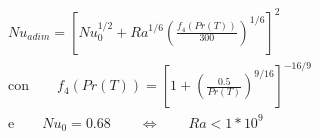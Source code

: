\documentclass[a4paper,10pt]{article}                                                                                       %
\begin{document}
\begin{equation}                                                                                                            %
  \begin{aligned}                                                                                                           %
  Nu_{adim} = \left[Nu_0^{1/2}+Ra^{1/6}\left(\frac{f_4(Pr(T))}{300}\right)^{1/6}\right]^{2}                                 %
  \\\text{con}\qquad                                                                                                        %
  f_4(Pr(T)) = \left[1+\left(\frac{0.5}{Pr(T)}\right)^{9/16}\right]^{-16/9}                                                 %
  \\\text{e}\qquad                                                                                                          %
  Nu_0 = 0.68                                                                                                               %
  \qquad\Leftrightarrow\qquad                                                                                               %
  Ra<1*10^9\qquad                                                                                                           %
  \label{eqn:nu_ra}                                                                                                         %
  \end{aligned}                                                                                                             %
\end{equation}                                                                                                              %
\end{document}
